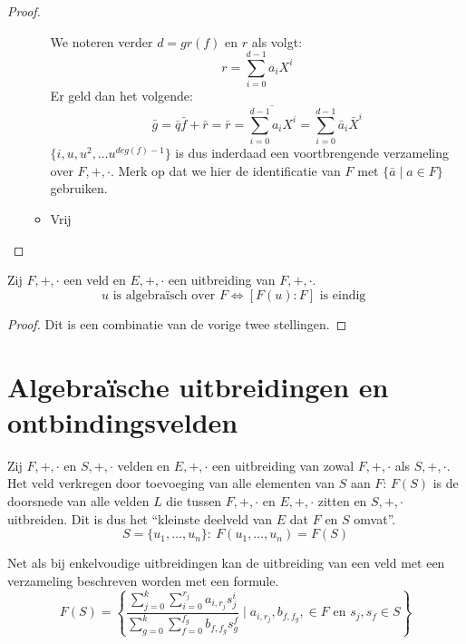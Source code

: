 \documentclass[main.tex]{subfiles}
\begin{document}
\begin{st}
\begin{proof}
\begin{itemize}
\begin{itemize}
        We noteren verder $d=gr(f)$ en $r$ als volgt:
        \[ r = \sum_{i=0}^{d-1}a_{i}X^{i} \]
        Er geld dan het volgende:\waarom
        \[ \bar{g} = \bar{q}\bar{f} + \bar{r} = \bar{r} = \overline{\sum_{i=0}^{d-1}a_{i}X^{i}} = \sum_{i=0}^{d-1}\bar{a}_{i}\bar{X}^{i} \]
        $\{ i,u,u^{2},\dotsc u^{deg(f)-1} \}$ is dus inderdaad een voortbrengende verzameling over $F,+,\cdot$.
        Merk op dat we hier de identificatie van $F$ met $\{ \bar{a}\mid a\in F\}$ gebruiken.
      \item Vrij\\
      \end{itemize}
    \end{itemize}
  \end{proof}
\end{st}

\begin{gev}
  Zij $F,+,\cdot$ een veld en $E,+,\cdot$ een uitbreiding van $F,+,\cdot$.
  \[ u \text{ is algebra\"isch over } F \Leftrightarrow [F(u):F] \text{ is eindig } \]

  \begin{proof}
    Dit is een combinatie van de vorige twee stellingen. 
  \end{proof}
\end{gev}

\section{Algebra\"ische uitbreidingen en ontbindingsvelden}
\label{sec:algebr-uitbr-en}

\begin{de}
  Zij $F,+,\cdot$ en $S,+,\cdot$ velden en $E,+,\cdot$ een uitbreiding van zowal $F,+,\cdot$ als $S,+,\cdot$.
  Het veld verkregen door toevoeging van alle elementen van $S$ aan $F$: $F(S)$ is de doorsnede van alle velden $L$ die tussen $F,+,\cdot$ en $E,+,\cdot$ zitten en $S,+,\cdot$ uitbreiden.
  Dit is dus het ``kleinste deelveld van $E$ dat $F$ en $S$ omvat''.
  \[ S = \{ u_{1},\dotsc,u_{n} \}:\ F(u_{1},\dotsc,u_{n}) = F(S) \]
\end{de}

\begin{ei}
  Net als bij enkelvoudige uitbreidingen kan de uitbreiding van een veld met een verzameling beschreven worden met een formule.
  \[
  F(S) =
  \left\{
    \dfrac
      {
        \sum_{j=0}^{k}\sum_{i=0}^{r_{j}}a_{i,r_{j}}s_{j}^{i}
      }
      {
        \sum_{g=0}^{k}\sum_{f=0}^{f_{g}}b_{f,f_{g}}s_{g}^{f}
      }
    \mid a_{i,r_{j}},b_{f,f_{g}}, \in F \text{ en } s_{j}, s_{f} \in S 
  \right\}
  \]
  \zb
\end{ei}
\end{document}
